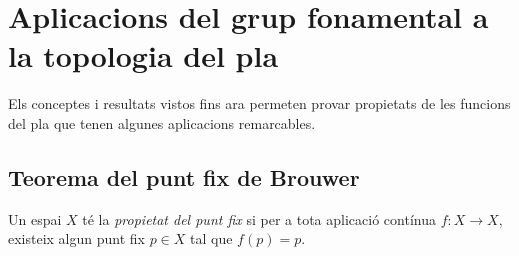 \documentclass[../main.tex]{subfiles}
\begin{document}
\section{Aplicacions del grup fonamental a la topologia del pla}

Els conceptes i resultats vistos fins ara permeten provar propietats de les funcions del pla que tenen algunes aplicacions remarcables.

\subsection{Teorema del punt fix de Brouwer}


\begin{defi}
\label{def:propietatdelpuntfix} Un espai $X$ té la \textit{propietat del punt fix} si per a tota aplicació contínua $f:X\rightarrow X$, existeix algun punt fix $p\in X$ tal que $f(p) = p$.
\end{defi}
\end{document}
